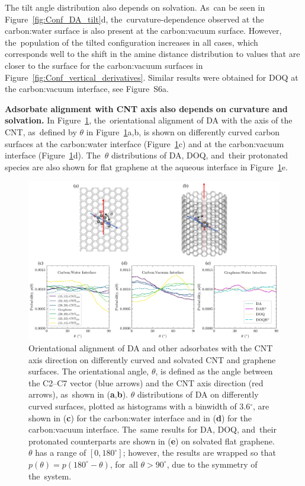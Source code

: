 \documentclass[molecules,article,accept,pdftex,moreauthors]{Definitions/mdpi}
\begin{document}
The tilt angle distribution also depends on solvation. As~can be seen in Figure~\ref{fig:Conf_DA_tilt}d, the~curvature-dependence observed at the carbon:water surface is also present at the carbon:vacuum surface. However, the~population of the tilted configuration increases in all cases, which corresponds well to the shift in the amine distance distribution to values that are closer to the surface for the carbon:vacuum surfaces in Figure~\ref{fig:Conf_vertical_derivatives}. Similar results were obtained for DOQ at the carbon:vacuum interface, see Figure~S6a.


 
{\bf Adsorbate alignment with CNT axis also depends on curvature and solvation.} %
In Figure~\ref{fig:theta_distn}, the~orientational alignment of DA with the axis of the CNT, as~defined by $\theta$ in Figure~\ref{fig:theta_distn}a,b, is shown on differently curved carbon surfaces at the carbon:water interface (Figure~\ref{fig:theta_distn}c) and at the carbon:vacuum interface (Figure~\ref{fig:theta_distn}d). The~$\theta$ distributions of DA, DOQ, and~their protonated species are also shown for flat graphene at the aqueous interface in Figure~\ref{fig:theta_distn}e.
\vspace{-6pt}

\begin{figure}[H]
    \includegraphics[width=\textwidth]{Figures/theta_output.png}
    \caption{Orientational alignment of DA and other adsorbates with the CNT axis direction on differently curved and solvated CNT and graphene surfaces. The orientational angle, $\theta$, is defined as the angle between the C2--C7 vector (blue arrows) and the CNT axis direction (red arrows), as~shown in (\textbf{a},\textbf{b}). $\theta$ distributions of DA on differently curved surfaces, plotted as histograms with a binwidth of  3.6$^\circ$, are shown in (\textbf{c}) for the carbon:water interface and in (\textbf{d}) for the carbon:vacuum interface. The~same results for DA, DOQ, and~their protonated counterparts are shown \linebreak in (\textbf{e}) on solvated flat graphene. $\theta$ has a range of $[0,180^\circ]$; however, the results are wrapped so that $p(\theta) = p(180^\circ-\theta)$, for~all $\theta>90^\circ$, due to the symmetry of the~system.}
    \label{fig:theta_distn}
\end{figure}
\end{document}

